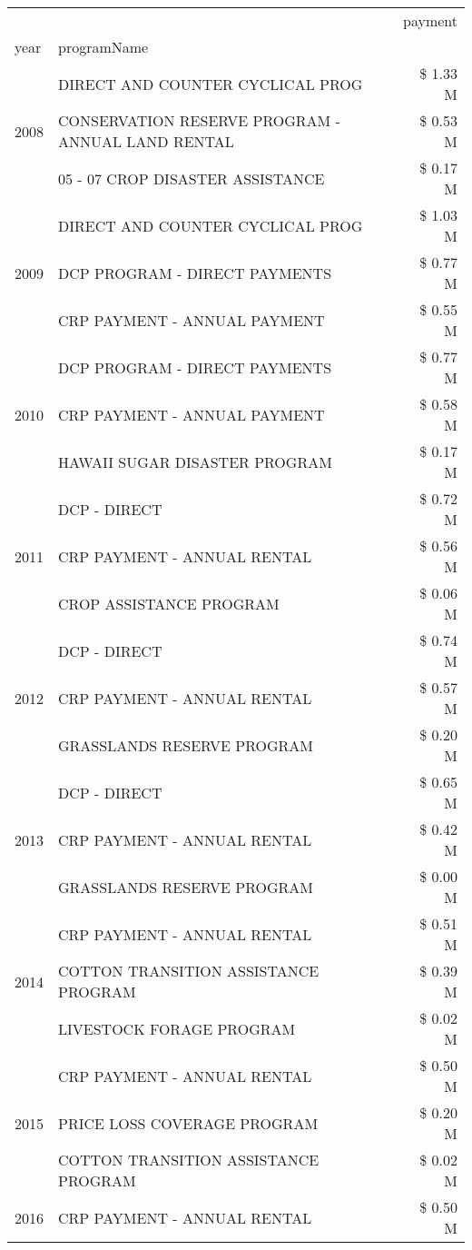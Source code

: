 \begin{tabular}{llr}
\toprule
 &  & payment \\
year & programName &  \\
\midrule
\multirow[t]{3}{*}{2008} & DIRECT AND COUNTER CYCLICAL PROG & \$ 1.33 M \\
 & CONSERVATION RESERVE PROGRAM - ANNUAL LAND RENTAL & \$ 0.53 M \\
 & 05 - 07 CROP DISASTER ASSISTANCE & \$ 0.17 M \\
\cline{1-3}
\multirow[t]{3}{*}{2009} & DIRECT AND COUNTER CYCLICAL PROG & \$ 1.03 M \\
 & DCP PROGRAM - DIRECT PAYMENTS & \$ 0.77 M \\
 & CRP PAYMENT - ANNUAL PAYMENT & \$ 0.55 M \\
\cline{1-3}
\multirow[t]{3}{*}{2010} & DCP PROGRAM - DIRECT PAYMENTS & \$ 0.77 M \\
 & CRP PAYMENT - ANNUAL PAYMENT & \$ 0.58 M \\
 & HAWAII SUGAR DISASTER PROGRAM & \$ 0.17 M \\
\cline{1-3}
\multirow[t]{3}{*}{2011} & DCP - DIRECT & \$ 0.72 M \\
 & CRP PAYMENT - ANNUAL RENTAL & \$ 0.56 M \\
 & CROP ASSISTANCE PROGRAM & \$ 0.06 M \\
\cline{1-3}
\multirow[t]{3}{*}{2012} & DCP - DIRECT & \$ 0.74 M \\
 & CRP PAYMENT - ANNUAL RENTAL & \$ 0.57 M \\
 & GRASSLANDS RESERVE PROGRAM & \$ 0.20 M \\
\cline{1-3}
\multirow[t]{3}{*}{2013} & DCP - DIRECT & \$ 0.65 M \\
 & CRP PAYMENT - ANNUAL RENTAL & \$ 0.42 M \\
 & GRASSLANDS RESERVE PROGRAM & \$ 0.00 M \\
\cline{1-3}
\multirow[t]{3}{*}{2014} & CRP PAYMENT - ANNUAL RENTAL & \$ 0.51 M \\
 & COTTON TRANSITION ASSISTANCE PROGRAM & \$ 0.39 M \\
 & LIVESTOCK FORAGE PROGRAM & \$ 0.02 M \\
\cline{1-3}
\multirow[t]{3}{*}{2015} & CRP PAYMENT - ANNUAL RENTAL & \$ 0.50 M \\
 & PRICE LOSS COVERAGE PROGRAM & \$ 0.20 M \\
 & COTTON TRANSITION ASSISTANCE PROGRAM & \$ 0.02 M \\
\cline{1-3}
\multirow[t]{3}{*}{2016} & CRP PAYMENT - ANNUAL RENTAL & \$ 0.50 M \\

\end{tabular}
